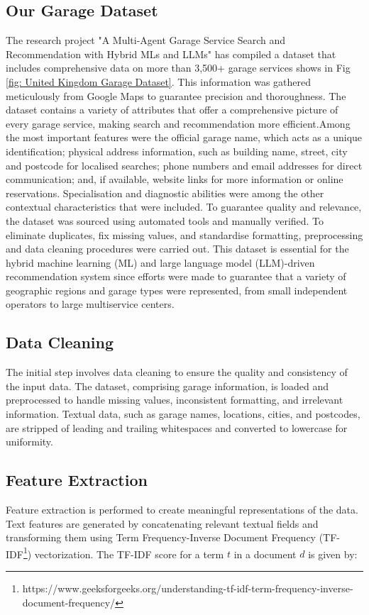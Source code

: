 \documentclass[conference]{IEEEtran}
\begin{document}
\subsection{Our Garage Dataset}
The research project "A Multi-Agent Garage Service Search and Recommendation with Hybrid MLs and LLMs" has compiled a dataset that includes comprehensive data on more than 3,500+ garage services shows in Fig \ref{fig: United Kingdom Garage Dataset}. This information was gathered meticulously from Google Maps to guarantee precision and thoroughness. The dataset contains a variety of attributes that offer a comprehensive picture of every garage service, making search and recommendation more efficient.Among the most important features were the official garage name, which acts as a unique identification; physical address information, such as building name, street, city and postcode for localised searches; phone numbers and email addresses for direct communication; and, if available, website links for more information or online reservations. Specialisation and diagnostic abilities were among the other contextual characteristics that were included. To guarantee quality and relevance, the dataset was sourced using automated tools and manually verified. To eliminate duplicates, fix missing values, and standardise formatting, preprocessing and data cleaning procedures were carried out. This dataset is essential for the hybrid machine learning (ML) and large language model (LLM)-driven recommendation system since efforts were made to guarantee that a variety of geographic regions and garage types were represented, from small independent operators to large multiservice centers.

\subsection{Data Cleaning}
The initial step involves data cleaning to ensure the quality and consistency of the input data. The dataset, comprising garage information, is loaded and preprocessed to handle missing values, inconsistent formatting, and irrelevant information. Textual data, such as garage names, locations, cities, and postcodes, are stripped of leading and trailing whitespaces and converted to lowercase for uniformity.

\subsection{Feature Extraction}
Feature extraction is performed to create meaningful representations of the data. Text features are generated by concatenating relevant textual fields and transforming them using Term Frequency-Inverse Document Frequency (TF-IDF\footnote{https://www.geeksforgeeks.org/understanding-tf-idf-term-frequency-inverse-document-frequency/}) vectorization. The TF-IDF score for a term \(t\) in a document \(d\) is given by:
\end{document}
